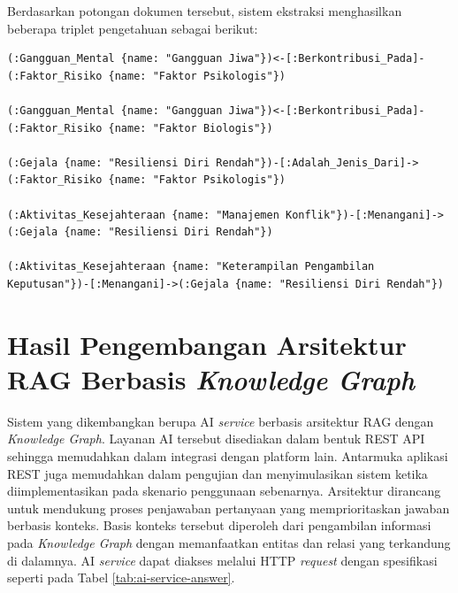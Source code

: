 Berdasarkan potongan dokumen tersebut, sistem ekstraksi menghasilkan beberapa triplet pengetahuan sebagai berikut:

\begin{lstlisting}[frame=single, numbers=none, basicstyle=\ttfamily\footnotesize]
(:Gangguan_Mental {name: "Gangguan Jiwa"})<-[:Berkontribusi_Pada]-(:Faktor_Risiko {name: "Faktor Psikologis"})

(:Gangguan_Mental {name: "Gangguan Jiwa"})<-[:Berkontribusi_Pada]-(:Faktor_Risiko {name: "Faktor Biologis"})

(:Gejala {name: "Resiliensi Diri Rendah"})-[:Adalah_Jenis_Dari]->(:Faktor_Risiko {name: "Faktor Psikologis"})

(:Aktivitas_Kesejahteraan {name: "Manajemen Konflik"})-[:Menangani]->(:Gejala {name: "Resiliensi Diri Rendah"})

(:Aktivitas_Kesejahteraan {name: "Keterampilan Pengambilan Keputusan"})-[:Menangani]->(:Gejala {name: "Resiliensi Diri Rendah"})
\end{lstlisting}

\section{Hasil Pengembangan Arsitektur RAG Berbasis \textit{Knowledge Graph}}

Sistem yang dikembangkan berupa AI \textit{service} berbasis arsitektur RAG dengan \textit{Knowledge Graph}.
Layanan AI tersebut disediakan dalam bentuk REST API sehingga memudahkan dalam integrasi dengan platform lain.
Antarmuka aplikasi REST juga memudahkan dalam pengujian dan menyimulasikan sistem ketika diimplementasikan pada skenario penggunaan sebenarnya.
Arsitektur dirancang untuk mendukung proses penjawaban pertanyaan yang memprioritaskan jawaban berbasis konteks.
Basis konteks tersebut diperoleh dari pengambilan informasi pada \textit{Knowledge Graph} dengan memanfaatkan entitas dan relasi yang terkandung di dalamnya.
AI \textit{service} dapat diakses melalui HTTP \textit{request} dengan spesifikasi seperti pada Tabel \ref{tab:ai-service-answer}.

